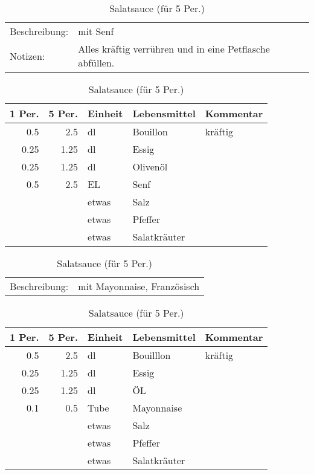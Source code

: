 \documentclass[11pt,a4paper]{article}%
\begin{document}
\begin{table}[h]%
\caption{Salatsauce (für 5 Per.)}%
\begin{tabularx}{\textwidth}{l X}%
Beschreibung: &mit Senf\\%
Notizen:&Alles kräftig verrühren und in eine Petflasche abfüllen.\\%
\end{tabularx}%
\par%
\begin{tabularx}{\textwidth}{| r | r | l | l | X |}%
\hline%
\tiny{1 Per.}&\tiny{5 Per.}&\tiny{Einheit}&\tiny{Lebensmittel}&\tiny{Kommentar}\\%
\hline%
0.5&2.5&dl&Bouillon&kräftig\\%
\hline%
0.25&1.25&dl&Essig&\\%
\hline%
0.25&1.25&dl&Olivenöl&\\%
\hline%
0.5&2.5&EL&Senf&\\%
\hline%
&&etwas&Salz&\\%
\hline%
&&etwas&Pfeffer&\\%
\hline%
&&etwas&Salatkräuter&\\%
\hline%
\end{tabularx}%
\end{table}

%
\vspace{0.75cm}%
\renewcommand{\arraystretch}{1.25}%


\begin{table}[h]%
\caption{Salatsauce (für 5 Per.)}%
\begin{tabularx}{\textwidth}{l X}%
Beschreibung: & mit Mayonnaise, Französisch\\%
\end{tabularx}%
\par%
\begin{tabularx}{\textwidth}{| r | r | l | l | X |}%
\hline%
\tiny{1 Per.}&\tiny{5 Per.}&\tiny{Einheit}&\tiny{Lebensmittel}&\tiny{Kommentar}\\%
\hline%
0.5&2.5&dl&Bouilllon&kräftig\\%
\hline%
0.25&1.25&dl&Essig&\\%
\hline%
0.25&1.25&dl&ÖL&\\%
\hline%
0.1&0.5&Tube&Mayonnaise&\\%
\hline%
&&etwas&Salz&\\%
\hline%
&&etwas&Pfeffer&\\%
\hline%
&&etwas&Salatkräuter&\\%
\hline%
\end{tabularx}%
\end{table}
\end{document}
